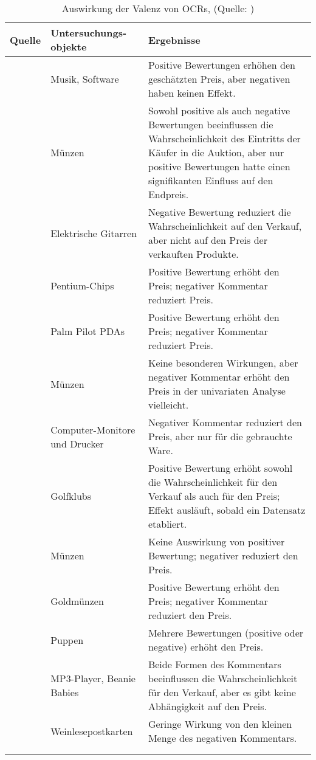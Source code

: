 \begin{longtable}{p{} p{}  p{}}
\hline
Quelle& Untersuchungs-objekte& Ergebnisse\\ \hline
\citet{ba2002evidence}& Musik, Software& Positive Bewertungen erhöhen den geschätzten Preis, aber negativen haben keinen Effekt.\\ \hline
\citet{bajari2003winner}& Münzen& Sowohl positive als auch negative Bewertungen beeinflussen die Wahrscheinlichkeit des Eintritts der Käufer in die Auktion, aber nur positive Bewertungen hatte einen signifikanten Einfluss auf den Endpreis. \\ \hline
\citet{eaton2002valuing}& Elektrische Gitarren& Negative Bewertung reduziert die Wahrscheinlichkeit auf den Verkauf, aber nicht auf den Preis der verkauften Produkte.\\ \hline
\citet{houser2006reputation}& Pentium-Chips& Positive Bewertung erhöht den Preis; negativer Kommentar reduziert Preis.\\ \hline
\citet{kalyanam2001returns}& Palm Pilot PDAs& Positive Bewertung erhöht den Preis; negativer Kommentar reduziert Preis.\\ \hline
\citet{kauffman2000running}& Münzen& Keine besonderen Wirkungen, aber negativer Kommentar erhöht den Preis in der univariaten Analyse vielleicht.\\ \hline
\citet{lee2000effect}& Computer-Monitore und Drucker& Negativer Kommentar reduziert den Preis, aber nur für die gebrauchte Ware.\\ \hline
\citet{livingston2005valuable}& Golfklubs& Positive Bewertung erhöht sowohl die Wahrscheinlichkeit für den Verkauf als auch für den Preis; Effekt ausläuft, sobald ein Datensatz etabliert.\\ \hline
\citet{lucking2007pennies}& Münzen& Keine Auswirkung von positiver Bewertung; negativer reduziert den Preis.\\ \hline
\citet{melnik2002does}& Goldmünzen& Positive Bewertung erhöht den Preis; negativer Kommentar reduziert den Preis.\\ \hline
\citet{mcdonald2002reputation}& Puppen& Mehrere Bewertungen (positive oder negative) erhöht den Preis. \\ \hline
\citet{resnick2002trust}& MP3-Player, Beanie Babies& Beide Formen des Kommentars beeinflussen die Wahrscheinlichkeit für den Verkauf, aber es gibt keine Abhängigkeit auf den Preis.\\ \hline
\citet{resnick2006value}& Weinlesepostkarten& Geringe Wirkung von den kleinen Menge des negativen Kommentars.\\ \hline
\caption[Auswirkung der Valenz von OCRs]{Auswirkung der Valenz von \ac{OCRs}, (Quelle: \citealp{Dellarocas2003})}\\
\label{tab:onlinefeedback}
\end{longtable}

